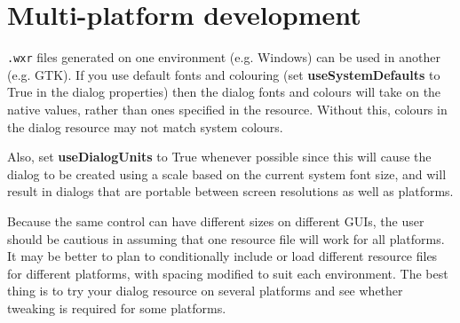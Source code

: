 \section{Multi-platform development}

{\tt .wxr} files generated on one environment (e.g. Windows) can be used in another (e.g. GTK).
If you use default fonts and colouring (set {\bf useSystemDefaults} to True in the dialog properties)
then the dialog fonts and colours will take on the native values, rather than ones specified in the
resource. Without this, colours in the dialog resource may not match system colours.

Also, set {\bf useDialogUnits} to True whenever possible since this will cause the dialog
to be created using a scale based on the current system font size, and will result in dialogs that are
portable between screen resolutions as well as platforms.

Because the same control can have different sizes on different GUIs,
the user should be cautious in assuming that one resource file will work for all
platforms. It may be better to plan to conditionally include or load different
resource files for different platforms, with spacing modified to suit each
environment. The best thing is to try your dialog resource on several platforms
and see whether tweaking is required for some platforms.

